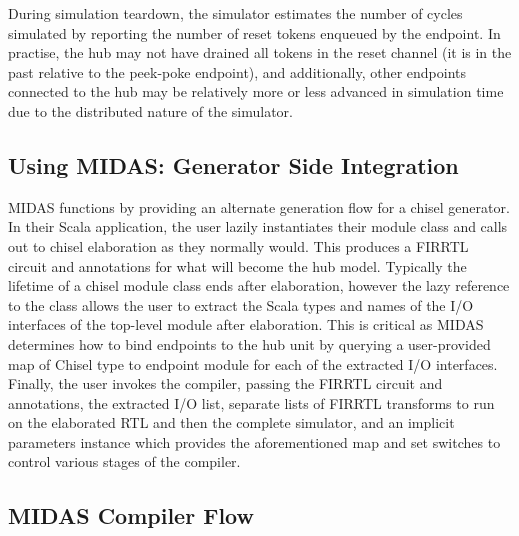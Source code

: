During simulation teardown, the simulator estimates the number of cycles simulated by
reporting the number of reset tokens enqueued by the endpoint. In practise,
the hub may not have drained all tokens in the reset channel (it is in the
past relative to the peek-poke endpoint), and additionally, other endpoints
connected to the hub may be relatively more or less advanced in simulation
time due to the distributed nature of the simulator.

\subsection{Using MIDAS: Generator Side Integration}

MIDAS functions by providing an alternate generation flow for a chisel
generator.  In their Scala application, the user lazily instantiates their
module class and calls out to chisel elaboration as they normally would.
This produces a FIRRTL circuit and annotations for what will become the hub
model.  Typically the lifetime of a chisel module class ends after
elaboration, however the lazy reference to the class allows the user to
extract the Scala types and names of the I/O interfaces of the top-level
module after elaboration. This is critical as MIDAS determines how to bind
endpoints to the hub unit by querying a user-provided map of Chisel type to
endpoint module for each of the extracted I/O interfaces. Finally, the user
invokes the compiler, passing the FIRRTL circuit and annotations, the
extracted I/O list, separate lists of FIRRTL transforms to run on the
elaborated RTL and then the complete simulator, and an implicit parameters
instance which provides the aforementioned map and set switches to control
various stages of the compiler.

\subsection{MIDAS Compiler Flow}

